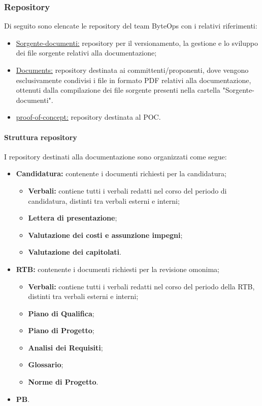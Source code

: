 \subsubsection{Repository}
Di seguito sono elencate le repository del team ByteOps con i relativi riferimenti:
\begin{itemize}
    \item \href{https://github.com/ByteOps-swe/Sorgente-documenti}{Sorgente-documenti:} repository per il versionamento, la gestione e lo sviluppo dei file sorgente relativi alla documentazione;
    \item \href{https://github.com/ByteOps-swe/Documents}{Documents:} repository destinata ai committenti/proponenti, dove vengono esclusivamente condivisi i file in formato PDF relativi alla documentazione, ottenuti dalla compilazione dei file sorgente presenti nella cartella "Sorgente-documenti".
    \item \href{https://github.com/ByteOps-swe/proof-of-concept}{proof-of-concept:} repository destinata al POC.
\end{itemize}
\paragraph{Struttura repository}
I repository destinati alla documentazione sono organizzati come segue:
\begin{itemize}
    \item \textbf{Candidatura:} contenente i documenti richiesti per la candidatura;
          \begin{itemize}
              \item \textbf{Verbali:} contiene tutti i verbali redatti nel corso del periodo di candidatura, distinti tra verbali esterni e interni;
              \item \textbf{Lettera di presentazione};
              \item \textbf{Valutazione dei costi e assunzione impegni};
              \item \textbf{Valutazione dei capitolati}.
          \end{itemize}
    \item \textbf{RTB:} contenente i documenti richiesti per la revisione omonima;
          \begin{itemize}
              \item \textbf{Verbali:} contiene tutti i verbali redatti nel corso del periodo della RTB, distinti tra verbali esterni e interni;
              \item \textbf{Piano di Qualifica};
              \item \textbf{Piano di Progetto};
              \item \textbf{Analisi dei Requisiti};
              \item \textbf{Glossario};
              \item \textbf{Norme di Progetto}.
          \end{itemize}
    \item \textbf{PB}.
\end{itemize}


